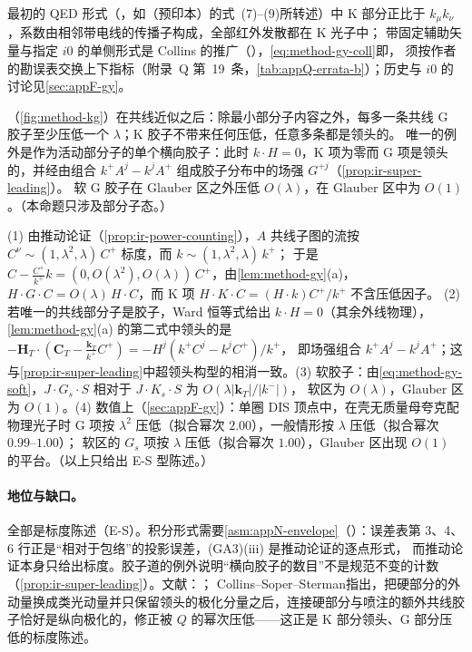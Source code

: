 最初的 QED 形式（\cite{GrammerYennie1973}，如\cite{SenIndumathiChoudhury2019}（预印本）的式~(7)--(9)所转述）中 K 部分正比于 $k_\mu k_\nu$，系数由相邻带电线的传播子构成，全部红外发散都在 K 光子中；
带固定辅助矢量与指定 $i0$ 的单侧形式是 Collins 的推广（\cite[第~5.5.6、10.6、11.9.3~节]{Collins2011}），\cref{eq:method-gy-coll}即\cite[式~(11.4)--(11.6)，第~402~页]{Collins2011}，
须按作者的勘误表交换上下指标（附录~Q 第~19~条，\cref{tab:appQ-errata-b}）；历史与 $i0$ 的讨论见\cref{sec:appF-gy}。


\begin{proposition}\label{prop:method-gy-suppression}
（\cref{fig:method-kg}）在共线近似之后：除最小部分子内容之外，每多一条共线 G 胶子至少压低一个 $\lambda$；K 胶子不带来任何压低，任意多条都是领头的。
唯一的例外是作为活动部分子的单个横向胶子：此时 $k\cdot H=0$，K 项为零而 G 项是领头的，并经由组合 $k^+A^j-k^jA^+$ 组成胶子分布中的场强 $G^{+j}$（\cref{prop:ir-super-leading}）。
软 G 胶子在 Glauber 区之外压低 $O(\lambda)$，在 Glauber 区中为 $O(1)$。（本命题只涉及部分子态。）
\end{proposition}

\begin{proofsketch}
(1) 由推动论证（\cref{prop:ir-power-counting}），$A$ 共线子图的流按 $C^\nu\sim(1,\lambda^2,\lambda)\,C^+$ 标度，而 $k\sim(1,\lambda^2,\lambda)\,k^+$；
于是 $C-\frac{C^+}{k^+}k=(0,O(\lambda^2),O(\lambda))\,C^+$，由\cref{lem:method-gy}(a)，$H\cdot G\cdot C=O(\lambda)\,H\cdot C$，而 K 项 $H\cdot K\cdot C=(H\cdot k)C^+/k^+$ 不含压低因子。
(2) 若唯一的共线部分子是胶子，Ward 恒等式给出 $k\cdot H=0$（其余外线物理），\cref{lem:method-gy}(a) 的第二式中领头的是 $-\mathbf H_T\cdot(\mathbf C_T-\frac{\mathbf k_T}{k^+}C^+)=-H^j(k^+C^j-k^jC^+)/k^+$，
即场强组合 $k^+A^j-k^jA^+$；这与\cref{prop:ir-super-leading}中超领头构型的相消一致。(3) 软胶子：由\cref{eq:method-gy-soft}，$J\cdot G_s\cdot S$ 相对于 $J\cdot K_s\cdot S$ 为 $O(\lambda|\mathbf k_T|/|k^-|)$，
软区为 $O(\lambda)$，Glauber 区为 $O(1)$。(4) 数值上（\cref{sec:appF-gy}）：单圈 DIS 顶点中，在壳无质量母夸克配物理光子时 G 项按 $\lambda^2$ 压低（拟合幂次 $2.00$），一般情形按 $\lambda$ 压低（拟合幂次 $0.99$--$1.00$）；
软区的 $G_s$ 项按 $\lambda$ 压低（拟合幂次 $1.00$），Glauber 区出现 $O(1)$ 的平台。（以上只给出 E-S 型陈述。）
\end{proofsketch}

\paragraph{地位与缺口。}全部是标度陈述（E-S）。积分形式需要\cref{asm:appN-envelope}（\tagA）：误差表第 3、4、6 行正是“相对于包络”的投影误差，(GA3)(iii) 是推动论证的逐点形式，
而推动论证本身只给出标度。胶子道的例外说明“横向胶子的数目”不是规范不变的计数（\cref{prop:ir-super-leading}）。文献：\cite[第~11.3~节]{Collins2011}；
Collins--Soper--Sterman\cite[第~8、9.1~节]{CollinsSoperSterman1989}指出，把硬部分的外动量换成类光动量并只保留领头的极化分量之后，连接硬部分与喷注的额外共线胶子恰好是纵向极化的，修正被 $Q$ 的幂次压低——这正是 K 部分领头、G 部分压低的标度陈述。
